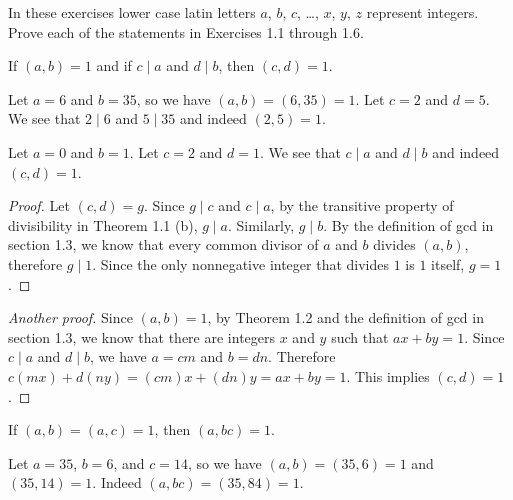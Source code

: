 
In these exercises lower case latin letters \( a \), \( b \), \( c \),
\dots, \( x \), \( y \), \( z \) represent integers. Prove each of the
statements in Exercises 1.1 through 1.6.

\begin{exercise}{1.1}
  If \( (a, b) = 1 \) and if \( c \mid a \) and \( d \mid b \), then
  \( (c, d) = 1 \).
\end{exercise}

\begin{example}
  Let \( a = 6 \) and \( b = 35 \), so we have \( (a, b) = (6, 35) = 1
  \). Let \( c = 2 \) and \( d = 5 \). We see that \( 2 \mid 6 \) and
  \( 5 \mid 35 \) and indeed \( (2, 5) = 1 \).
\end{example}

\begin{example}
  Let \( a = 0 \) and \( b = 1 \). Let \( c = 2 \) and \( d = 1 \). We
  see that \( c \mid a \) and \( d \mid b \) and indeed \( (c, d) = 1
  \).
\end{example}

\begin{proof}
  Let \( (c, d) = g \). Since \( g \mid c \) and \( c \mid a \), by
  the transitive property of divisibility in Theorem 1.1 (b), \( g
  \mid a \). Similarly, \( g \mid b \). By the definition of gcd in
  section 1.3, we know that every common divisor of \( a \) and \( b
  \) divides \( (a, b) \), therefore \( g \mid 1 \). Since the only
  nonnegative integer that divides \( 1 \) is \( 1 \) itself, \( g = 1
  \).
\end{proof}

\begin{proof}[Another proof]
  Since \( (a, b) = 1 \), by Theorem 1.2 and the definition of gcd in
  section 1.3, we know that there are integers \( x \) and \( y \)
  such that \( ax + by = 1 \). Since \( c \mid a \) and \( d \mid b
  \), we have \( a = cm \) and \( b = dn \). Therefore \( c(mx) +
  d(ny) = (cm)x + (dn)y = ax + by = 1 \). This implies \( (c, d) = 1
  \).
\end{proof}


\begin{exercise}{1.2}
  If \( (a, b) = (a, c) = 1 \), then \( (a, bc) = 1 \).
\end{exercise}

\begin{example}
  Let \( a = 35 \), \( b = 6 \), and \( c = 14 \), so we have \( (a,
  b) = (35, 6) = 1 \) and \( (35, 14) = 1 \). Indeed \( (a, bc) = (35,
  84) = 1 \).
\end{example}

